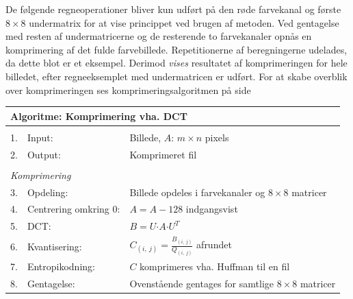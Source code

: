 De følgende regneoperationer bliver kun udført på den røde farvekanal og første $8 \times 8$ undermatrix for at vise princippet ved brugen af metoden. Ved gentagelse med resten af undermatricerne og de resterende to farvekanaler opnås en komprimering af det fulde farvebillede. Repetitionerne af beregningerne udelades, da dette blot er et eksempel. Derimod \textit{vises} resultatet af komprimeringen for hele billedet, efter regneeksemplet med undermatricen er udført. For at skabe overblik over komprimeringen ses komprimeringsalgoritmen på side \pageref{tb:Algoritme-Komprimering-DCT}
\begin{table}[!h]
\centering
\begin{tabular}{lll}
\hline
\multicolumn{3}{l}{\textbf{Algoritme: Komprimering vha. DCT}}                           \\ \hline
\\
\multicolumn{1}{|l}{1.}        & Input:                     & Billede, $A$: $m \times n$ pixels             \\
\multicolumn{1}{|l}{2.}        & Output:                    & Komprimeret fil       \\
                               &                            &                        \\
\multicolumn{2}{|l}{\textit{Komprimering}}                  &                        \\
\multicolumn{1}{|l}{3.}        & Opdeling:                  & Billede opdeles i farvekanaler og $8 \times 8$ matricer \\
\multicolumn{1}{|l}{4.}        & Centrering omkring 0:      & $A = A - 128$ indgangsvist    \\
\multicolumn{1}{|l}{5.}        & DCT:              & $B = U \boldsymbol{\cdot} A \boldsymbol{\cdot} U^T$  \\
\multicolumn{1}{|l}{6.}        & Kvantisering:              & $C_{(i,\ j)} = \frac{B_{(i,\ j)}}{Q_{(i,\ j)}}$ afrundet\\
\multicolumn{1}{|l}{7.}        & Entropikodning:           & $C$ komprimeres vha. Huffman til en fil              \\
\multicolumn{1}{|l}{8.}        & Gentagelse:                & Ovenstående gentages for samtlige $8 \times 8$ matricer\\
\end{tabular}
\label{tb:Algoritme-Komprimering-DCT}
\end{table}

